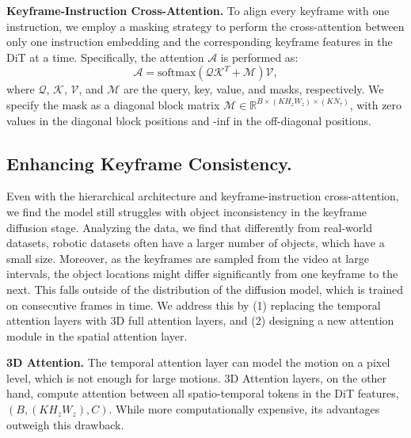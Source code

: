 \documentclass[letterpaper, 10 pt, conference]{ieeeconf}  %
\begin{document}
\noindent\textbf{Keyframe-Instruction Cross-Attention.} To align every keyframe with one instruction, we employ a masking strategy to perform the cross-attention between only one instruction embedding and the corresponding keyframe features in the DiT at a time. Specifically, the attention $\mathcal{A}$ is performed as:
\begin{equation}
    \mathcal{A} = \textrm{softmax}(\mathcal{Q}\mathcal{K}^T + \mathcal{M}) \mathcal{V},
\end{equation}
where $\mathcal{Q}$, $\mathcal{K}$, $\mathcal{V}$, and $\mathcal{M}$ are the query, key, value, and masks, respectively. We specify the mask as a diagonal block matrix $\mathcal{M} \in \mathbb{R}^{B \times (KH_zW_z) \times (KN_{\tau})}$, with zero values in the diagonal block positions and -inf in the off-diagonal positions.

\subsection{Enhancing Keyframe Consistency.} 
\label{sec:iatt}
Even with the hierarchical architecture and keyframe-instruction cross-attention, we find the model still struggles with object inconsistency in the keyframe diffusion stage. Analyzing the data, we find that differently from real-world datasets, robotic datasets often have a larger number of objects, which have a small size. Moreover, as the keyframes are sampled from the video at large intervals, the object locations might differ significantly from one keyframe to the next. This falls outside of the distribution of the diffusion model, which is trained on consecutive frames in time.  We address this by (1) replacing the temporal attention layers with 3D full attention layers, and (2) designing a new attention module in the spatial attention layer.

\noindent\textbf{3D Attention.} The temporal attention layer can model the motion on a pixel level, which is not enough for large motions. 3D Attention layers, on the other hand, compute attention between all spatio-temporal tokens in the DiT features, $(B, (KH_zW_z), C)$. While more computationally expensive, its advantages outweigh this drawback.
\end{document}
